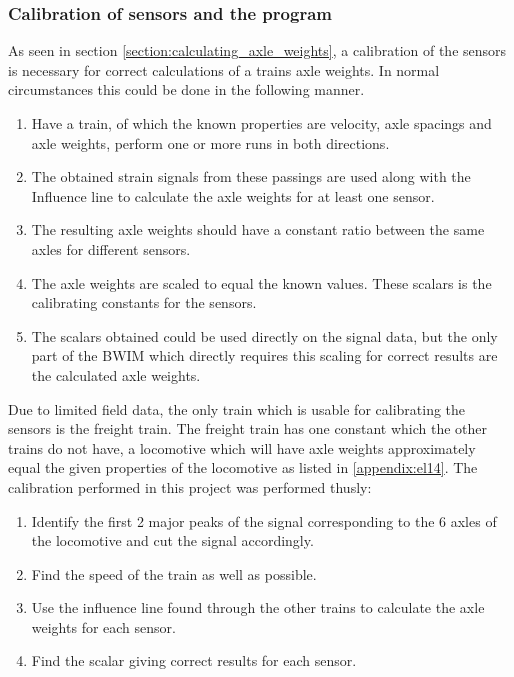 \subsubsection{Calibration of sensors and the program}
\label{calibration}
As seen in section \ref{section:calculating_axle_weights}, a calibration of the sensors is necessary for correct calculations of a trains axle weights. In normal circumstances this could be done in the following manner.
\begin{enumerate}
	\item Have a train, of which the known properties are velocity, axle spacings and axle weights, perform one or more runs in both directions.
	\item The obtained strain signals from these passings are used along with the Influence line to calculate the axle weights for at least one sensor.
	\item The resulting axle weights should have a constant ratio between the same axles for different sensors.
	\item The axle weights are scaled to equal the known values. These scalars is the calibrating constants for the sensors.
	\item The scalars obtained could be used directly on the signal data, but the only part of the BWIM which directly requires this scaling for correct results are the calculated axle weights.
\end{enumerate}
Due to limited field data, the only train which is usable for calibrating the sensors is the freight train. The freight train has one constant which the other trains do not have, a locomotive which will have axle weights approximately equal the given properties of the locomotive as listed in \ref{appendix:el14}. The calibration performed in this project was performed thusly:
\begin{enumerate}
	\item Identify the first 2 major peaks of the signal corresponding to the 6 axles of the locomotive and cut the signal accordingly.
	\item Find the speed of the train as well as possible.
	\item Use the influence line found through the other trains to calculate the axle weights for each sensor.
	\item Find the scalar giving correct results for each sensor.
\end{enumerate}

